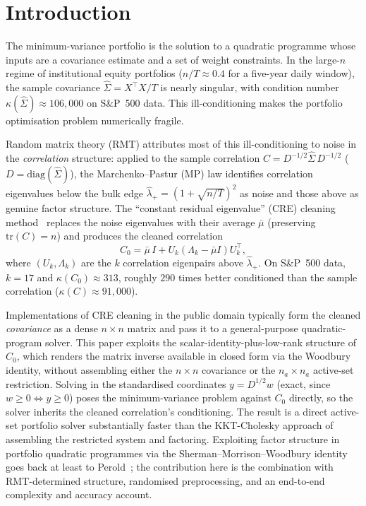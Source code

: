 \section{Introduction}

The minimum-variance portfolio is the solution to a quadratic programme whose
inputs are a covariance estimate and a set of weight constraints. In the large-$n$
regime of institutional equity portfolios ($n/T \approx 0.4$ for a five-year daily
window), the sample covariance $\hat\Sigma = X^\top X/T$ is nearly singular,
with condition number $\kappa(\hat\Sigma) \approx 106{,}000$ on S\&P~500 data.
This ill-conditioning makes the portfolio optimisation problem numerically fragile.

Random matrix theory (RMT) attributes most of this ill-conditioning to noise in
the \emph{correlation} structure: applied to the sample correlation
$C = D^{-1/2}\hat\Sigma\,D^{-1/2}$ ($D = \mathrm{diag}(\hat\Sigma)$), the
Marchenko--Pastur (MP) law identifies correlation eigenvalues below the bulk edge
$\hat\lambda_+ = (1+\sqrt{n/T})^2$ as noise and those above as genuine factor
structure. The ``constant residual eigenvalue'' (CRE) cleaning
method~\cite{laloux1999,bun2017,bouchaud2003} replaces the noise eigenvalues with
their average $\bar\mu$ (preserving $\mathrm{tr}(C) = n$) and produces the cleaned
correlation
\[
  C_0 = \bar\mu\, I + U_k(\Lambda_k - \bar\mu I)U_k^\top,
\]
where $(U_k, \Lambda_k)$ are the $k$ correlation eigenpairs above $\hat\lambda_+$.
On S\&P~500 data, $k = 17$ and $\kappa(C_0) \approx 313$, roughly $290$ times
better conditioned than the sample correlation ($\kappa(C) \approx 91{,}000$).

Implementations of CRE cleaning in the public domain typically form the cleaned
\emph{covariance} as a dense $n \times n$ matrix and pass it to a general-purpose
quadratic-program solver. This paper exploits the
scalar-identity-plus-low-rank structure of $C_0$, which renders the matrix inverse
available in closed form via the Woodbury identity, without assembling either the
$n \times n$ covariance or the $n_a \times n_a$ active-set restriction. Solving in
the standardised coordinates $y = D^{1/2}w$ (exact, since
$w \geq 0 \Leftrightarrow y \geq 0$) poses the minimum-variance problem against
$C_0$ directly, so the solver inherits the cleaned correlation's conditioning. The
result is a direct active-set portfolio solver substantially faster than the
KKT-Cholesky approach of assembling the restricted system and factoring.
Exploiting factor structure in portfolio quadratic programmes via the
Sherman--Morrison--Woodbury identity goes back at least to
Perold~\cite{perold1984}; the contribution here is the combination with
RMT-determined structure, randomised preprocessing, and an end-to-end
complexity and accuracy account.

